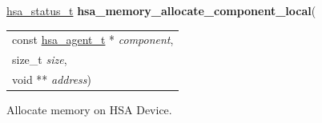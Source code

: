 \documentclass[final]{book}
\newcommand{\hsaarg}[1]{\textit{#1}}
\begin{document}
\noindent\begin{tcolorbox}[breakable,nobeforeafter,colframe=white,colback=lightgray,left=0mm]
\hyperlink{group--status-1gad755322e7ff95456520e8abdbe90d225}{hsa_status_t} \hypertarget{group--memory--local-1ga40d441131fce376e8c65ae5087bc916a}{\textbf{hsa_memory_allocate_component_local}}(
\vspace{-3.5mm}\begin{longtable}{@{}p{\textwidth}}
\hspace{1.7em}const \hyperlink{group--topology-1gab8db3fb886332a24acac08ec361e1d86}{hsa_agent_t} * \hsaarg{component},\\
\hspace{1.7em}size_t \hsaarg{size},\\
\hspace{1.7em}void ** \hsaarg{address})\end{longtable}

\end{tcolorbox}
Allocate memory on HSA Device.
\end{document}
